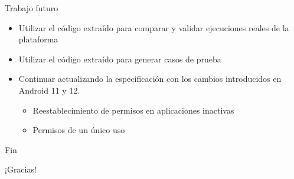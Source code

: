 \documentclass[pdf]{beamer} %
\begin{document}
\begin{frame}{Trabajo futuro}
    \begin{itemize}
        \item Utilizar el código extraído para comparar y validar ejecuciones reales de la
              plataforma
        \item Utilizar el código extraído para generar casos de prueba
        \item Continuar actualizando la especificación con los cambios introducidos en Android 11 y
              12.
              \begin{itemize}
                  \item Reestablecimiento de permisos en aplicaciones inactivas
                  \item Permisos de un único uso
              \end{itemize}
    \end{itemize}
\end{frame}

\begin{frame}{Fin}
    \begin{center}
        \huge¡Gracias!
    \end{center}
\end{frame}

\end{document}
